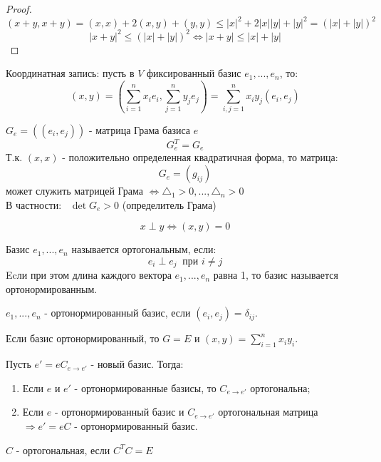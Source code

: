 \begin{proof}
    $$(x+y, x+y) = (x, x) + 2(x, y) + (y, y) \leq |x|^2 + 2|x||y| + |y|^2 = (|x|+|y|)^2$$
    $$|x+y|^2 \leqslant (|x|+|y|)^2 \Longleftrightarrow |x+y| \leq |x| + |y|$$  
\end{proof}
Координатная запись: пусть в $V$ фиксированный базис $e_1,...,e_n$, то: 
$$(x,y) = (\sum \limits_{i=1}^nx_ie_i, \sum \limits_{j=1}^ny_je_j) = \sum \limits_{i,j=1}^nx_iy_j(e_i,e_j)$$
\begin{definition}
    $G_e = ((e_i,e_j))$ - матрица Грама базиса $e$
    $$G_e^T = G_e$$ 
    Т.к. $(x,x)$ - положительно определенная квадратичная форма, то матрица: 
    $$G_e = (g_{ij})$$ 
    может служить матрицей Грама $\Longleftrightarrow \triangle_1 >0,...,\triangle_n > 0$ \\
    В частности: \ $\det G_e >0$ (определитель Грама)   
\end{definition}
\begin{center}
\end{center}
\begin{definition}
    $$x \perp y \Longleftrightarrow (x,y) = 0$$ 
\end{definition}
\begin{definition}
    Базис $e_1,...,e_n$ называется ортогональным, если: 
    $$e_i \perp e_j \ \text{ при } i \neq j$$
    Ecли при этом длина каждого вектора $e_1,...,e_n$ равна 1, то базис называется ортонормированным.
\end{definition}
\begin{consequense}
    $e_1,...,e_n$ - ортонормированный базис, если $(e_i,e_j) = \delta_{ij}$.  
\end{consequense}
\begin{consequense}
    Если базис ортонормированный, то $G = E$ и $(x,y) = \sum \limits_{i=1}^nx_iy_i$.
\end{consequense}
\begin{theorem} Пусть $e' = eC_{e\to e'}$ - новый базис. Тогда: 
    \begin{enumerate}
        \item Если $e$ и $e'$ - ортонормированные базисы, то $C_{e \to e'}$ ортогональна;
        \item Если $e$ - ортонормированный базис и $C_{e \to e'}$ ортогональная матрица $\Longrightarrow e' = eC$ - ортонормированный базис.
    \end{enumerate}
\end{theorem}
\begin{remark}
    $C$ - ортогональная, если $C^TC = E$  
\end{remark} 
